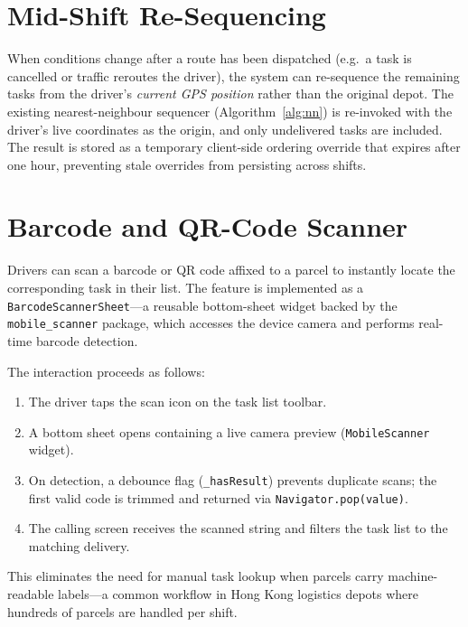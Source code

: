 \section{Mid-Shift Re-Sequencing}
\label{sec:reseq-impl}

When conditions change after a route has been dispatched (e.g.\ a task is
cancelled or traffic reroutes the driver), the system can re-sequence the
remaining tasks from the driver's \emph{current GPS position} rather than the
original depot.  The existing nearest-neighbour sequencer
(Algorithm~\ref{alg:nn}) is re-invoked with the driver's live coordinates as
the origin, and only undelivered tasks are included.  The result is stored as
a temporary client-side ordering override that expires after one hour,
preventing stale overrides from persisting across shifts.

\section{Barcode and QR-Code Scanner}
\label{sec:barcode-impl}

Drivers can scan a barcode or QR code affixed to a parcel to instantly locate
the corresponding task in their list.  The feature is implemented as a
\texttt{BarcodeScannerSheet}—a reusable bottom-sheet widget backed by the
\texttt{mobile\_scanner} package, which accesses the device camera and
performs real-time barcode detection.

The interaction proceeds as follows:

\begin{enumerate}
  \item The driver taps the scan icon on the task list toolbar.
  \item A bottom sheet opens containing a live camera preview
        (\texttt{MobileScanner} widget).
  \item On detection, a debounce flag (\texttt{\_hasResult}) prevents
        duplicate scans; the first valid code is trimmed and returned via
        \texttt{Navigator.pop(value)}.
  \item The calling screen receives the scanned string and filters the task
        list to the matching delivery.
\end{enumerate}

This eliminates the need for manual task lookup when parcels carry
machine-readable labels—a common workflow in Hong Kong logistics depots
where hundreds of parcels are handled per shift.

